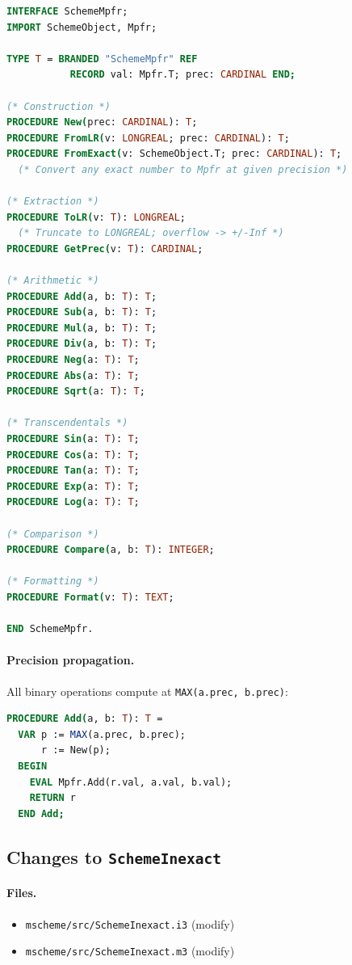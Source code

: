 \documentclass[12pt]{article}
\begin{document}
\begin{lstlisting}[language=Modula3]
INTERFACE SchemeMpfr;
IMPORT SchemeObject, Mpfr;

TYPE T = BRANDED "SchemeMpfr" REF
           RECORD val: Mpfr.T; prec: CARDINAL END;

(* Construction *)
PROCEDURE New(prec: CARDINAL): T;
PROCEDURE FromLR(v: LONGREAL; prec: CARDINAL): T;
PROCEDURE FromExact(v: SchemeObject.T; prec: CARDINAL): T;
  (* Convert any exact number to Mpfr at given precision *)

(* Extraction *)
PROCEDURE ToLR(v: T): LONGREAL;
  (* Truncate to LONGREAL; overflow -> +/-Inf *)
PROCEDURE GetPrec(v: T): CARDINAL;

(* Arithmetic *)
PROCEDURE Add(a, b: T): T;
PROCEDURE Sub(a, b: T): T;
PROCEDURE Mul(a, b: T): T;
PROCEDURE Div(a, b: T): T;
PROCEDURE Neg(a: T): T;
PROCEDURE Abs(a: T): T;
PROCEDURE Sqrt(a: T): T;

(* Transcendentals *)
PROCEDURE Sin(a: T): T;
PROCEDURE Cos(a: T): T;
PROCEDURE Tan(a: T): T;
PROCEDURE Exp(a: T): T;
PROCEDURE Log(a: T): T;

(* Comparison *)
PROCEDURE Compare(a, b: T): INTEGER;

(* Formatting *)
PROCEDURE Format(v: T): TEXT;

END SchemeMpfr.
\end{lstlisting}

\paragraph{Precision propagation.}
All binary operations compute at {\tt MAX(a.prec, b.prec)}:

\begin{lstlisting}[language=Modula3]
PROCEDURE Add(a, b: T): T =
  VAR p := MAX(a.prec, b.prec);
      r := New(p);
  BEGIN
    EVAL Mpfr.Add(r.val, a.val, b.val);
    RETURN r
  END Add;
\end{lstlisting}

\subsection{Changes to {\tt SchemeInexact}}

\paragraph{Files.}
\begin{itemize}[nosep]
\item {\tt mscheme/src/SchemeInexact.i3} (modify)
\item {\tt mscheme/src/SchemeInexact.m3} (modify)
\end{itemize}
\end{document}
